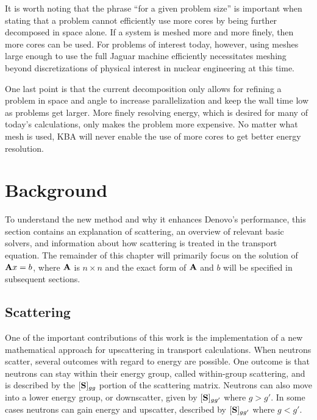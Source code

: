 It is worth noting that the phrase ``for a given problem size'' is important when stating that a problem cannot efficiently use more cores by being further decomposed in space alone. If a system is meshed more and more finely, then more cores can be used. For problems of interest today, however, using meshes large enough to use the full Jaguar machine efficiently necessitates meshing beyond discretizations of physical interest in nuclear engineering at this time. 

One last point is that the current decomposition only allows for refining a problem in space and angle to increase parallelization and keep the wall time low as problems get larger. More finely resolving energy, which is desired for many of today's calculations, only makes the problem more expensive. No matter what mesh is used, KBA will never enable the use of more cores to get better energy resolution.

\section{Background}
To understand the new method and why it enhances Denovo's performance, this section contains an explanation of scattering, an overview of relevant basic solvers, and information about how scattering is treated in the transport equation. The remainder of this chapter will primarily focus on the solution of $\mathbf{A}x = b$, where $\mathbf{A}$ is $n \times n$  and the exact form of $\mathbf{A}$ and $b$ will be specified in subsequent sections.

\subsection{Scattering}
One of the important contributions of this work is the implementation of a new mathematical approach for upscattering in transport calculations. When neutrons scatter, several outcomes with regard to energy are possible. One outcome is that neutrons can stay within their energy group, called within-group scattering, and is described by the $[\mathbf{S}]_{gg}$ portion of the scattering matrix. Neutrons can also move into a lower energy group, or downscatter, given by $[\mathbf{S}]_{gg'}$ where $g > g'$. In some cases neutrons can gain energy and upscatter, described by $[\mathbf{S}]_{gg'}$ where $g < g'$. 

